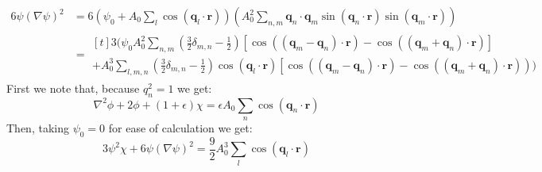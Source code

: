 \documentclass[reqno]{article}
\begin{document}
\begin{equation*}
\begin{split}
        6 \psi \left(\nabla \psi \right)^2
        &=
        6 \left(\psi_0 + A_0 \sum_l \cos(\mathbf{q}_l \cdot \mathbf{r})\right)
        \left( A_0^2 \sum_{n, m} \mathbf{q}_n \cdot \mathbf{q}_m \sin(\mathbf{q}_n \cdot \mathbf{r}) \sin(\mathbf{q}_m \cdot \mathbf{r}) \right) \\
        &= 
        \begin{multlined}[t]
        3 \biggl(
        \psi_0 A_0^2 \sum_{n, m} \left(\frac32 \delta_{m, n} - \frac12\right) \left[\cos((\mathbf{q}_m - \mathbf{q}_n)\cdot \mathbf{r}) - \cos((\mathbf{q}_m + \mathbf{q}_n)\cdot \mathbf{r}) \right] \\
        + A_0^3 \sum_{l, m, n} \left(\frac32 \delta_{m, n} - \frac12\right) \cos(\mathbf{q}_l \cdot \mathbf{r}) \left[\cos((\mathbf{q}_m - \mathbf{q}_n)\cdot \mathbf{r}) - \cos((\mathbf{q}_m + \mathbf{q}_n)\cdot \mathbf{r}) \right)
        \biggr)
        \end{multlined}
    \end{split}
\end{equation*}
First we note that, because $q_n^2 = 1$ we get:
\begin{equation*}
    \nabla^2 \phi + 2 \phi + (1 + \epsilon) \chi
    =
    \epsilon A_0 \sum_n \cos(\mathbf{q}_n \cdot \mathbf{r})
\end{equation*}
Then, taking $\psi_0 = 0$ for ease of calculation we get:
\begin{equation}
    3 \psi^2 \chi + 6 \psi \left(\nabla \psi\right)^2
    =
    \frac92 A_0^3 \sum_l \cos(\mathbf{q}_l \cdot \mathbf{r})
\end{equation}
\end{document}
